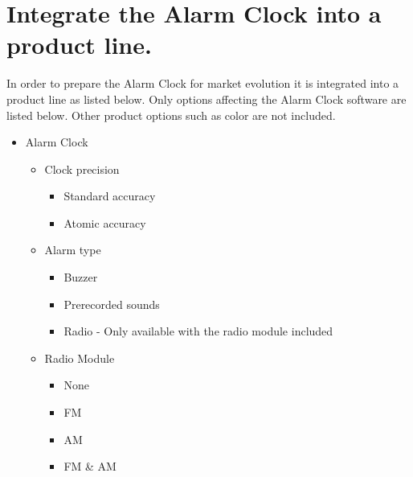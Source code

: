 \documentclass[Main_Assignment3]{subfiles}
\begin{document}
\section{Integrate the Alarm Clock into a product line.}

In order to prepare the Alarm Clock for market evolution it is integrated into a product line as listed below.
Only options affecting the Alarm Clock software are listed below. Other product options such as color are not included.
\begin{itemize}
	\item Alarm Clock
	\begin{itemize}
		\item Clock precision
		\begin{itemize}
			\item Standard accuracy
			\item Atomic accuracy
		\end{itemize}
		\item Alarm type
		\begin{itemize}
			\item Buzzer
			\item Prerecorded sounds
			\item Radio - Only available with the radio module included
		\end{itemize}
		\item Radio Module
		\begin{itemize}
			\item None
			\item FM
			\item AM
			\item FM \& AM
		\end{itemize}
	\end{itemize}
\end{itemize}
\end{document}
